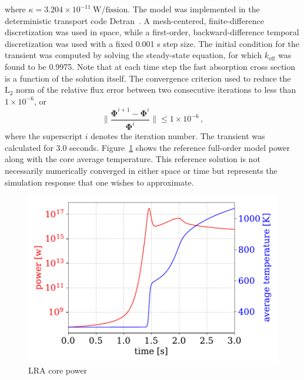 \documentclass[]{interact}
\theoremstyle{plain}%
\theoremstyle{definition}
\theoremstyle{remark}
\begin{document}
where $\kappa = 3.204\times 10^{-11}~ \text{W/fission}$.
The model was implemented in the deterministic transport code Detran~\cite{roberts2014advanced}.
A mesh-centered, finite-difference discretization was used in space, while a first-order, backward-difference temporal discretization was used with a fixed 0.001 s step size.  
The initial condition for the transient was computed by solving the steady-state equation, for which $k_{\text{eff}}$ was found to be 0.9975.
Note that at each time step the fast absorption cross section is a function of the solution itself.
The convergence criterion used to reduce the $\text{L}_2$ norm  of the relative flux error between two consecutive iterations to less than $1\times 10^{-6}$, or
\begin{equation}
	\|\frac{\mathbf{\Phi}^{i+1} - \mathbf{\Phi}^{i}} {\mathbf{\Phi}^i}\| \le  1\times 10^{-6} \, ,
	\label{eq:convergance criteria} 
\end{equation}
where the superscript $i$ denotes the iteration number.
The transient was calculated for 3.0 seconds.
Figure~\ref{fig:lra fom power} shows the reference full-order model power along with the core average temperature.
This reference solution is not necessarily numerically converged in either space or time but represents the simulation response that one wishes to approximate.
\begin{figure}[h!]
	\includegraphics[width=1.0\linewidth]{../figures/LRA_fom_power_temperature.pdf}
	\caption{LRA core power}
	\label{fig:lra fom power}
\end{figure}

\end{document}
